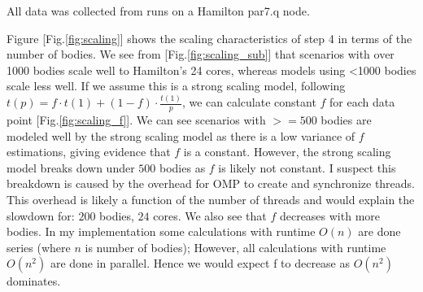 \documentclass{article}
\begin{document}
All data was collected from runs on a Hamilton par7.q node.

Figure [Fig.\ref{fig:scaling}] shows the scaling characteristics of step 4 in terms of the number of bodies. 
We see from [Fig.\ref{fig:scaling_sub}] that scenarios with over 1000 bodies scale well to Hamilton's 24 cores, whereas models using <1000 bodies scale less well. 
If we assume this is a strong scaling model, following $t(p) = f \cdot t(1) + (1-f)\cdot \frac{t(1)}{p}$, we can calculate constant $f$ for each data point [Fig.\ref{fig:scaling_f}]. We can see scenarios with $>=500$ bodies are modeled well by the strong scaling model as there is a low variance of $f$ estimations, giving evidence that $f$ is a constant. 
However, the strong scaling model breaks down under $500$ bodies as $f$ is likely not constant. 
I suspect this breakdown is caused by the overhead for OMP to create and synchronize threads. 
This overhead is likely a function of the number of threads and would explain the slowdown for: $200$ bodies, $24$ cores.
We also see that $f$ decreases with more bodies. In my implementation some calculations with runtime $O(n)$ are done series (where $n$ is number of bodies); However, all calculations with runtime $O(n^2)$ are done in parallel. Hence we would expect f to decrease as $O(n^2)$ dominates.
\end{document}
